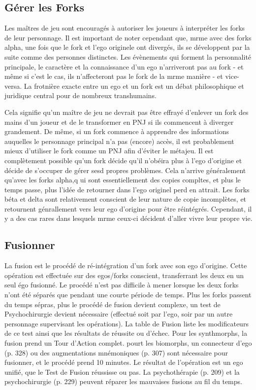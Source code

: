 \subsection{Gérer les Forks} 

Les maîtres de jeu sont encouragés à autoriser les joueurs à interpréter les forks de leur personnage. Il est important de noter cependant que, mrme avec des forks alpha, une fois que le fork et l'ego originele ont divergés, ils se développent par la suite comme des personnes distinctes. Les évènements qui forment la personnalité principale, le caractère et la connaissance d'un ego n'arriveront pas au fork - et même si c'est le cas, ils n'affecteront pas le fork de la mrme manière - et vice-versa. La frotnière exacte entre un ego et un fork est un débat philosophique et juridique central pour de nombreux transhumains. 

Cela signifie qu'un maître de jeu ne devrait pas être effrayé d'enlever un fork des mains d'un joueur et de le transformer en PNJ si ils commencent à diverger grandement. De même, si un fork commence à apprendre des informations auquelles le personnage principal n'a pas (encore) accès, il est probablement mieux d'utiliser le fork comme un PNJ afin d'éviter le métajeu. Il est complètement possible qu'un fork décide qu'il n'obéira plus à l'ego d'origine et décide de s'occuper de gérer sesd propres problèmes. Cela n'arrive généralement qu'avec les forks alpha,q ui sont essentiellement des copies compltes, et plus le temps passe, plus l'idée de retourner dans l'ego originel perd en attrait. Les forks béta et delta sont relativement conscient de leur nature de copie incomplètes, et retournent génrallement vers leur ego d'origine pour être réintégrés. Cependant, il y a des cas rares dans lesquels mrme ceux-ci décident d'aller vivre leur propre vie. 

\subsection{Fusionner} 

La fusion est le procédé de ré-intégration d'un fork avec son ego d'origine. Cette opération est effectuée sur des egos/forks conscient, transferrant les deux en un seul égo fusionné. Le procédé n'est pas difficile à mener lorsque les deux forks n'ont été séparés que pendant une courte période de temps. Plus les forks passent du temps sépras, plus le procédé de fusion devient complexe, un test de Psychochirurgie devient nécessaire (effectué soit par l'ego, soir par un autre personnage supervisant les opérations). La table de Fusion liste les modificateurs de ce test ainsi que les résultats de réussite ou d'échec. Pour les synthmorphs, la fusion prend un Tour d'Action complet. pourt les biomorphs, un connecteur d'ego (p. 328) ou des augmentations mnémoniques (p. 307) sont nécessaire pour fusionner, et le procédé prend 10 minutes. Le résultat de l'opération est un ego unifié, que le Test de Fusion réussisse ou pas. La psychothérapie (p. 209) et la psychochirurgie (p. 229) peuvent réparer les mauvaises fusions au fil du temps. \\ 

